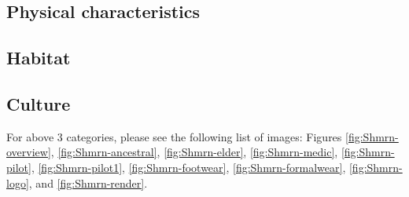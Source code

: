 \subsection{Physical characteristics}

\subsection{Habitat}

\subsection{Culture}

For above 3 categories, please see the following list of images: Figures \ref{fig:Shmrn-overview}, \ref{fig:Shmrn-ancestral}, \ref{fig:Shmrn-elder}, \ref{fig:Shmrn-medic}, \ref{fig:Shmrn-pilot}, \ref{fig:Shmrn-pilot1}, \ref{fig:Shmrn-footwear}, \ref{fig:Shmrn-formalwear}, \ref{fig:Shmrn-logo}, and \ref{fig:Shmrn-render}.

